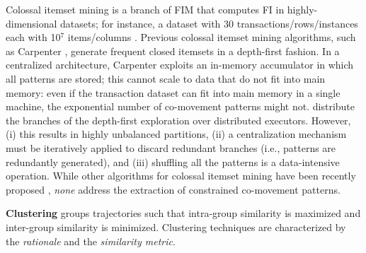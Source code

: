 \documentclass[
]{ceurart}
\newcommand{\mg}[1]{{\color{red}{\textbf{#1}}}}
\begin{document}
Colossal itemset mining is a branch of FIM that computes FI in highly-dimensional datasets; for instance, a dataset with 30 transactions/rows/instances each with 10$^7$ items/columns \citep{DBLP:journals/bdr/ApilettiBCGPM17}.
Previous colossal itemset mining algorithms, such as Carpenter \citep{DBLP:conf/kdd/PanCTYZ03}, generate frequent closed itemsets in a depth-first fashion.
In a centralized architecture, Carpenter exploits an in-memory accumulator in which all patterns are stored; this cannot scale to data that do not fit into main memory: even if the transaction dataset can fit into main memory in a single machine, the exponential number of co-movement patterns might not.
\cite{DBLP:journals/bdr/ApilettiBCGPM17} distribute the branches of the depth-first exploration over distributed executors. 
However, (i) this results in highly unbalanced partitions,
(ii) a centralization mechanism must be iteratively applied to discard redundant branches (i.e., patterns are redundantly generated),
and (iii) shuffling all the patterns is a data-intensive operation.
While other algorithms for colossal itemset mining have been recently proposed \citep{DBLP:conf/kdd/PanCTYZ03,DBLP:journals/kbs/ZakiZ18,DBLP:journals/isci/VanahalliP19}, \textit{none} address the extraction of constrained co-movement patterns.

\textbf{Clustering}
groups trajectories such that intra-group similarity is maximized and inter-group similarity is minimized. 
Clustering techniques are characterized by the \textit{rationale} and the \textit{similarity metric}.
\end{document}
